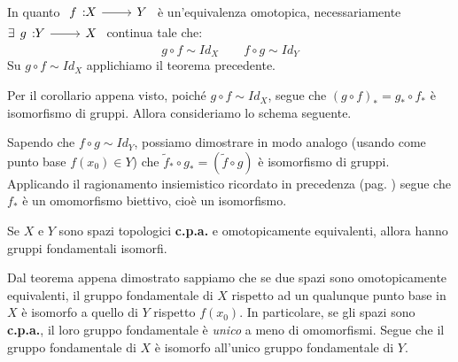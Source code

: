 \begin{demonstration}
In quanto $\funz{f}{X}{Y}$ è un'equivalenza omotopica, necessariamente $\exists \funz{g}{Y}{X}$ continua tale che:
\begin{equation*}
g\circ f\sim Id_X\qquad f\circ g\sim Id_Y
\end{equation*}
Su $g\circ f\sim Id_X$ applichiamo il teorema precedente.
\begin{center}
\end{center}
Per il corollario appena visto, poiché $g\circ f\sim Id_X$, segue che $\left(g\circ f\right)_{\ast}=g_\ast\circ f_\ast$ è isomorfismo di gruppi. Allora consideriamo lo schema seguente.
\begin{center}
\end{center}
Sapendo che $f\circ g\sim Id_Y$, possiamo dimostrare in modo analogo (usando come punto base $f\left(x_0\right)\in Y$) che $\tilde{f}_\ast\circ g_\ast=\left(\tilde{f}\circ g\right)$ è isomorfismo di gruppi.\\
Applicando il ragionamento insiemistico ricordato in precedenza (pag. \pageref{biettivitàinsiemi}) segue che $f_{\ast}$ è un omomorfismo biettivo, cioè un isomorfismo.
\end{demonstration}
\begin{corollary}
	Se $X$ e $Y$ sono spazi topologici \textbf{c.p.a.} e omotopicamente equivalenti, allora hanno gruppi fondamentali isomorfi.
\end{corollary}
\begin{demonstration}
	Dal teorema appena dimostrato sappiamo che se due spazi sono omotopicamente equivalenti, il gruppo fondamentale di $X$ rispetto ad un qualunque punto base in $X$ è isomorfo a quello di $Y$ rispetto $f\left(x_0\right)$. In particolare, se gli spazi sono \textbf{c.p.a.}, il loro gruppo fondamentale è \textit{unico} a meno di omomorfismi. Segue che il gruppo fondamentale di $X$ è isomorfo all'unico gruppo fondamentale di $Y$.
\end{demonstration}

